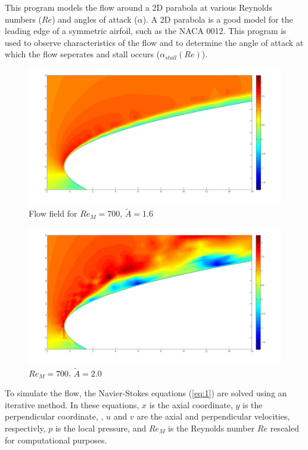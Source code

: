 \documentclass{article}
\begin{document}
This program models the flow around a 2D parabola at various Reynolds numbers ($Re$) and angles of attack ($\alpha$). A 2D parabola is a good model for the leading edge of a symmetric airfoil, such as the NACA 0012. This program is used to observe characteristics of the flow and to determine the angle of attack at which the flow seperates and stall occurs ($\alpha_{stall}(Re)$).

\begin{figure}[!ht]
\includegraphics[width=\textwidth]{FF1p6.pdf}
\caption{Flow field for $Re_M = 700$, $\tilde{A} = 1.6$}
\label{fig:FF1p6}
\end{figure}

\begin{figure}[!ht]
\includegraphics[width=\textwidth]{FF2p0.pdf}
\caption{$Re_M = 700$, $\tilde{A} = 2.0$}
\label{fig:FF2p0}
\end{figure}

To simulate the flow, the Navier-Stokes equations (\ref{eq:1}) are solved using an iterative method. In these equations, $x$ is the axial coordinate, $y$ is the perpendicular coordinate, , $u$ and $v$ are the axial and perpendicular velocities, respectivly, $p$ is the local pressure, and $Re_M$ is the Reynolds number $Re$ rescaled for computational purposes.
\end{document}
